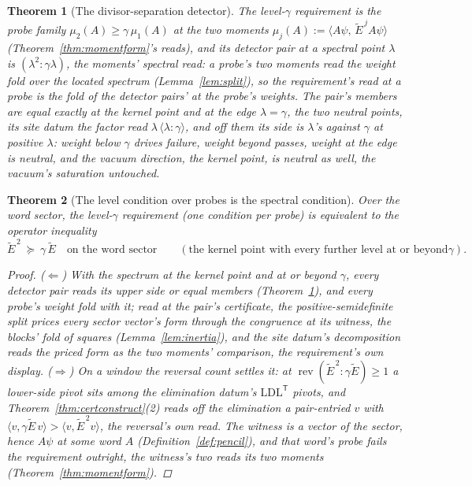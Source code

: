 \documentclass[11pt]{article}
\newtheorem{theorem}{Theorem}
\theoremstyle{definition}
\begin{document}
\begin{theorem}[The divisor-separation detector]\label{thm:detector}
The level-$\gamma$ \emph{requirement} is the probe family
$\mu_2(A)\ge\gamma\,\mu_1(A)$ at the two moments
$\mu_j(A):=\langle A\psi,\,\tilde E^{\,j}A\psi\rangle$
(Theorem~\ref{thm:momentform}'s reads), and its \emph{detector pair} at a
spectral point $\lambda$ is $(\lambda^2\!:\!\gamma\lambda)$, the
moments' spectral read: a probe's two moments read the weight fold
over the located spectrum (Lemma~\ref{lem:split}), so the
requirement's read at a probe is the fold of the detector pairs' at
the probe's weights. The pair's members are equal exactly at the
kernel point and at the edge $\lambda=\gamma$, the two neutral
points, its site datum the factor read
$\lambda\,\langle\lambda\!:\!\gamma\rangle$, and off them its side
is $\lambda$'s against $\gamma$ at positive $\lambda$: weight below
$\gamma$ drives failure, weight beyond passes, weight at the edge
is neutral, and the vacuum direction, the kernel point, is neutral
as well, the vacuum's saturation untouched.
\end{theorem}

\begin{theorem}[The level condition over probes is the spectral condition]
\label{thm:levelequiv}
Over the word sector, the level-$\gamma$ requirement (one condition per
probe) is \emph{equivalent} to the operator inequality
\[
\tilde E^{\,2}\ \succeq\ \gamma\,\tilde E
\quad\text{on the word sector}
\qquad(\text{the kernel point with every further level at or beyond
}\gamma).
\]
\begin{proof}
($\Leftarrow$) With the spectrum at the kernel point and at or beyond
$\gamma$, every detector pair reads its upper side or equal members
(Theorem~\ref{thm:detector}), and every probe's weight fold with
it; read at the pair's certificate, the positive-semidefinite
split prices every sector vector's form through the congruence at
its witness, the blocks' fold of squares
(Lemma~\ref{lem:inertia}), and the site datum's decomposition
reads the priced form as the two moments' comparison, the
requirement's own display. ($\Rightarrow$) On a window the reversal count settles it: at
$\operatorname{rev}(\tilde E^{\,2}\!:\!\gamma\tilde E)\ge1$ a
lower-side
pivot sits among the elimination datum's $\mathrm{LDL}^{\mathsf T}$ pivots, and
Theorem~\ref{thm:certconstruct}(2) reads off the elimination a pair-entried $v$
with $\langle v,\gamma\tilde E\,v\rangle>\langle v,\tilde E^{\,2}v\rangle$,
the reversal's own read. The witness is a
vector of the sector, hence $A\psi$ at some word $A$
(Definition~\ref{def:pencil}), and that word's probe fails the
requirement outright, the witness's two reads its two moments
(Theorem~\ref{thm:momentform}).
\end{proof}

\end{theorem}
\end{document}
